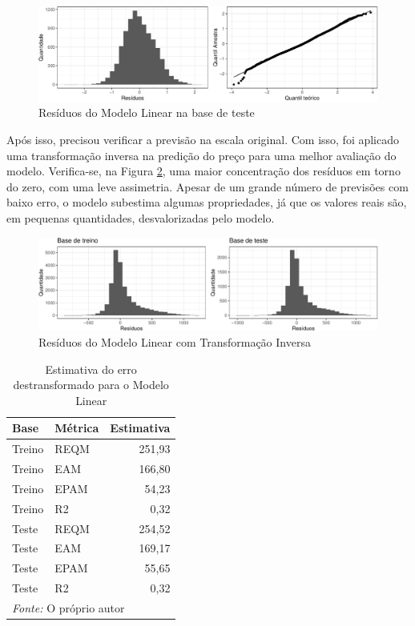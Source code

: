 \documentclass[
	12pt,				%
	a4paper,		%
	oneside,    %
	chapter=TITLE,		   %
	section=TITLE,		   %
	subsection=TITLE,	   %
	subsubsection=TITLE, %
	english,			%
	french,				%
	spanish,			%
	brazil,				%
]{abntex2}
\begin{document}
\begin{figure}
\centering
\includegraphics{00-TCC_files/figure-latex/resid_ml_test-1.pdf}
\caption{\label{resid_ml_test}Resíduos do Modelo Linear na base de
teste}
\end{figure}

Após isso, precisou verificar a previsão na escala original. Com isso,
foi aplicado uma transformação inversa na predição do preço para uma
melhor avaliação do modelo. Verifica-se, na Figura \ref{resid_ml_inv},
uma maior concentração dos resíduos em torno do zero, com uma leve
assimetria. Apesar de um grande número de previsões com baixo erro, o
modelo subestima algumas propriedades, já que os valores reais são, em
pequenas quantidades, desvalorizadas pelo modelo.

\begin{figure}
\centering
\includegraphics{00-TCC_files/figure-latex/resid_ml_inv-1.pdf}
\caption{\label{resid_ml_inv}Resíduos do Modelo Linear com Transformação
Inversa}
\end{figure}

\begin{table}

\caption{\label{tab:lm_metricas}Estimativa do erro destransformado para o Modelo Linear}
\centering
\begin{tabular}[t]{l|l|r}
\hline
Base & Métrica & Estimativa\\
\hline
Treino & REQM & 251,93\\
\hline
Treino & EAM & 166,80\\
\hline
Treino & EPAM & 54,23\\
\hline
Treino & R2 & 0,32\\
\hline
Teste & REQM & 254,52\\
\hline
Teste & EAM & 169,17\\
\hline
Teste & EPAM & 55,65\\
\hline
Teste & R2 & 0,32\\
\hline
\multicolumn{3}{l}{\textit{Fonte: } O próprio autor}\\
\end{tabular}
\end{table}
\end{document}
